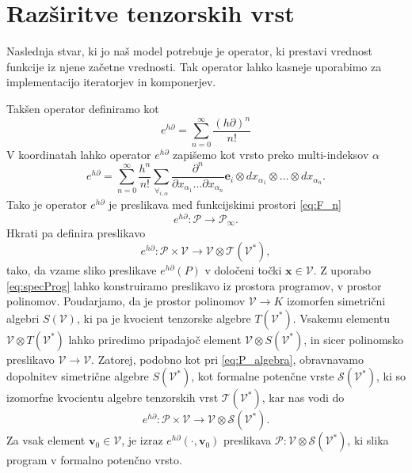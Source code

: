 \documentclass[a4paper, 12pt]{book}
\newcommand{\ed}{e^{h\partial}}
\newcommand{\Ss}{\mathcal{S}}
\newcommand{\T}{\mathcal{T}}
\newcommand{\VV}{\mathcal{V}}
\newcommand{\e}{\mathbf{e}}
\newcommand{\x}{\mathbf{x}}
\newcommand{\vv}{\mathbf{v}}
\newcommand{\dP}{\mathcal{P}}
\newcommand{\D}{\partial}
\begin{document}
\section{Razširitve tenzorskih vrst}\label{sec:vrsta}

Naslednja stvar, ki jo naš model potrebuje je operator, ki prestavi vrednost funkcije iz njene začetne vrednosti. Tak operator lahko kasneje uporabimo za implementacijo iteratorjev in komponerjev.

Takšen operator definiramo kot
\begin{equation*}
 	e^{h\D}=\sum\limits_{n=0}^{\infty}\frac{(h\D)^n}{n!}
 \end{equation*}
V koordinatah lahko operator $e^{h\D}$ zapišemo kot vrsto preko multi-indeksov $\alpha$
\begin{equation}\label{eq:e^d}
 	e^{h\D}=\sum\limits_{n=0}^{\infty}\frac{h^n}{n!}\sum_{\forall_{i,\alpha}}\frac{\partial^n}{\partial
 		    x_{\alpha_1}\ldots \partial x_{\alpha_n}}\e_i\otimes
 		  dx_{\alpha_1}\otimes\ldots \otimes dx_{\alpha_n}.
 \end{equation}
Tako je operator $e^{h\D}$ je preslikava med funkcijskimi prostori \eqref{eq:F_n}
 \begin{equation*}
 	e^{h\D}:\dP\to\dP_\infty.
 \end{equation*}
Hkrati pa definira preslikavo
  \begin{equation}\label{eq:specProg}
  	e^{h\D}:\dP\times \VV\to \VV\otimes \T(\VV^*),
  \end{equation}
tako, da vzame sliko preslikave $\ed(P)$ v določeni točki $\x\in\VV$. Z uporabo \eqref{eq:specProg} lahko konstruiramo preslikavo iz prostora programov, v prostor polinomov. Poudarjamo, da je prostor polinomov $\VV\to K$ izomorfen simetrični algebri $S(\VV)$, ki pa je kvocient tenzorske algebre $T(\VV^*)$. Vsakemu elementu $\VV\otimes T(\VV^*)$ lahko priredimo pripadajoč element $\VV\otimes S(\VV^*)$, in sicer polinomsko preslikavo $\VV\to\VV$. Zatorej, podobno kot pri \eqref{eq:P_algebra}, obravnavamo dopolnitev simetrične algebre $S(\VV^*)$, kot formalne potenčne vrste $\Ss(\VV^ *)$, ki so izomorfne kvocientu algebre tenzorskih vrst $\T(\VV^ *)$, kar nas vodi do
\begin{equation}\label{eq:pToPol}
 	e^{h\D}: \dP\times \VV\to \VV\otimes \Ss(\VV^*).
 \end{equation}
Za vsak element $\vv_0\in\VV$, je izraz $\ed(\cdot,\vv_0)$ preslikava $\dP:\VV\otimes\Ss(\VV^ *)$, ki slika program v formalno potenčno vrsto.
\end{document}
